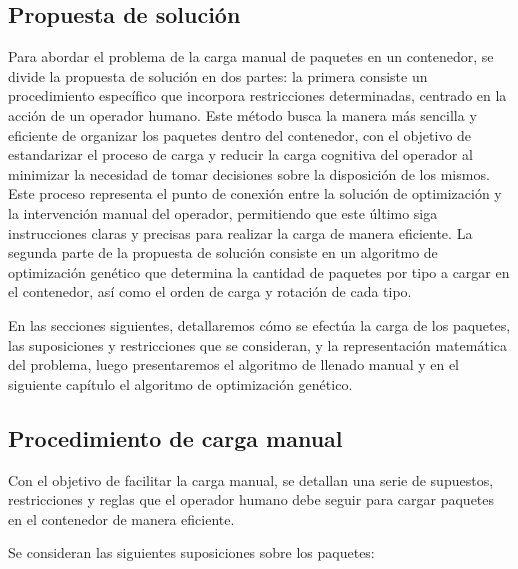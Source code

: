 \subsection{Propuesta de solución}

Para abordar el problema de la carga manual de paquetes en un contenedor, se divide la propuesta de solución en dos partes: la primera consiste un procedimiento específico que incorpora restricciones determinadas, centrado en la acción de un operador humano. Este método busca la manera más sencilla y eficiente de organizar los paquetes dentro del contenedor, con el objetivo de estandarizar el proceso de carga y reducir la carga cognitiva del operador al minimizar la necesidad de tomar decisiones sobre la disposición de los mismos. Este proceso representa el punto de conexión entre la solución de optimización y la intervención manual del operador, permitiendo que este último siga instrucciones claras y precisas para realizar la carga de manera eficiente. La segunda parte de la propuesta de solución consiste en un algoritmo de optimización genético que determina la cantidad de paquetes por tipo a cargar en el contenedor, así como el orden de carga y rotación de cada tipo.

En las secciones siguientes, detallaremos cómo se efectúa la carga de los paquetes, las suposiciones y restricciones que se consideran, y la representación matemática del problema, luego presentaremos el algoritmo de llenado manual y en el siguiente capítulo el algoritmo de optimización genético.

\subsection{Procedimiento de carga manual}

Con el objetivo de facilitar la carga manual, se detallan una serie de supuestos, restricciones y reglas que el operador humano debe seguir para cargar paquetes en el contenedor de manera eficiente.

Se consideran las siguientes suposiciones sobre los paquetes:

